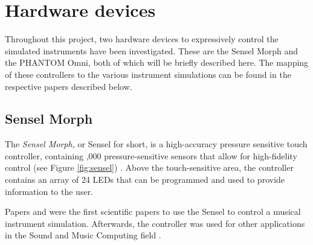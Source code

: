 




\section{Hardware devices}
Throughout this project, two hardware devices to expressively control the simulated instruments have been investigated. These are the Sensel Morph and the PHANTOM Omni, both of which will be briefly described here. The mapping of these controllers to the various instrument simulations can be found in the respective papers described below. 

\subsection{Sensel Morph}\label{sec:sensel}
The \textit{Sensel Morph,} or Sensel for short, is a high-accuracy pressure sensitive touch controller, containing ,000 pressure-sensitive sensors that allow for high-fidelity control (see Figure \ref{fig:sensel}) \cite{sensel}. Above the touch-sensitive area, the controller contains an array of 24 LEDs that can be programmed and used to provide information to the user.

Papers \citeP[A] and \citeP[B] were the first scientific papers to use the Sensel to control a musical instrument simulation. Afterwards, the controller was used for other applications in the Sound and Music Computing field \cite{Paisa2019,Pardue2020,vanWalstijn2021}. 

